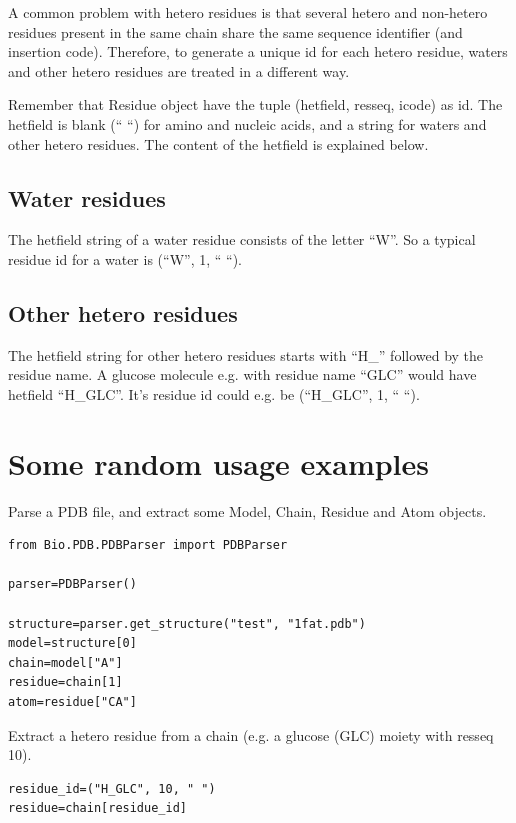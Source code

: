 \documentclass{report}
\begin{document}
A common problem with hetero residues is that several hetero and non-hetero
residues present in the same chain share the same sequence identifier (and insertion
code). Therefore, to generate a unique id for each hetero residue, waters and
other hetero residues are treated in a different way.

Remember that Residue object have the tuple (hetfield, resseq, icode) as id.
The hetfield is blank ({}`` {}``) for amino and nucleic acids, and a string
for waters and other hetero residues. The content of the hetfield is explained
below.

\subsection{Water residues}

The hetfield string of a water residue consists of the letter {}``W{}''. So
a typical residue id for a water is ({}``W{}'', 1, {}`` {}``).

\subsection{Other hetero residues}

The hetfield string for other hetero residues starts with {}``H\_{}'' followed
by the residue name. A glucose molecule e.g. with residue name {}``GLC{}''
would have hetfield {}``H\_GLC{}''. It's residue id could e.g. be ({}``H\_GLC{}'',
1, {}`` {}``).

\section{Some random usage examples}

Parse a PDB file, and extract some Model, Chain, Residue and Atom objects.

\begin{verbatim}
from Bio.PDB.PDBParser import PDBParser

parser=PDBParser()

structure=parser.get_structure("test", "1fat.pdb")
model=structure[0]
chain=model["A"]
residue=chain[1]
atom=residue["CA"]
\end{verbatim}

Extract a hetero residue from a chain (e.g. a glucose (GLC) moiety with resseq
10).

\begin{verbatim}
residue_id=("H_GLC", 10, " ")
residue=chain[residue_id]
\end{verbatim}
\end{document}

